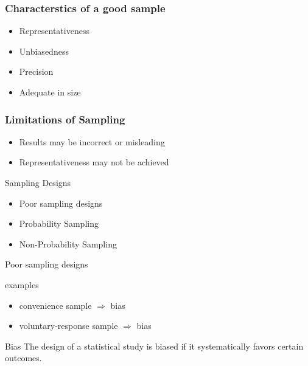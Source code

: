 \documentclass[10pt, compress]{beamer}
\begin{document}
\begin{frame}
    \frametitle{Characterstics of a good sample}
    \begin{itemize}
        \item Representativeness
        \item Unbiasedness
        \item Precision
        \item Adequate in size
    \end{itemize}
\end{frame}

\begin{frame}
    \frametitle{Limitations of Sampling}
    \begin{itemize}
        \item Results may be incorrect or misleading
        \item Representativeness may not be achieved
    \end{itemize}
\end{frame}

\begin{frame}[t]{Sampling Designs}
    \begin{itemize}
        \item Poor sampling designs
        \item Probability Sampling
        \item Non-Probability Sampling
    \end{itemize}
\end{frame}

\begin{frame}[t]{Poor sampling designs}
    \begin{block}{examples}
        \begin{itemize}
            \item convenience sample $\Rightarrow$ bias
            \item voluntary-response sample $\Rightarrow$ bias
        \end{itemize}
    \end{block}
    \begin{block}{Bias}
        The design of a statistical study is biased if it systematically favors certain outcomes.
    \end{block}
\end{frame}
\end{document}
